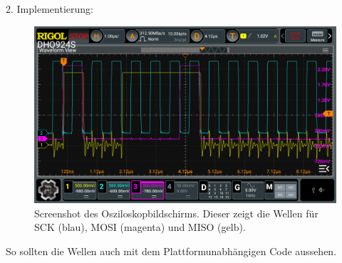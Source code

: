 2. Implementierung:\\







\vspace{5mm}

\begin{figure}[H]
	\includegraphics[width=\textwidth]{Pics/oszi_cube_spi_example.png}
	\caption{Screenshot des Osziloskopbildschirms. Dieser zeigt die Wellen für SCK (blau), MOSI (magenta) und MISO (gelb).}
	\label{fig:oszi_cube_spi_example}
\end{figure}

So sollten die Wellen auch mit dem Plattformunabhängigen Code aussehen.














































